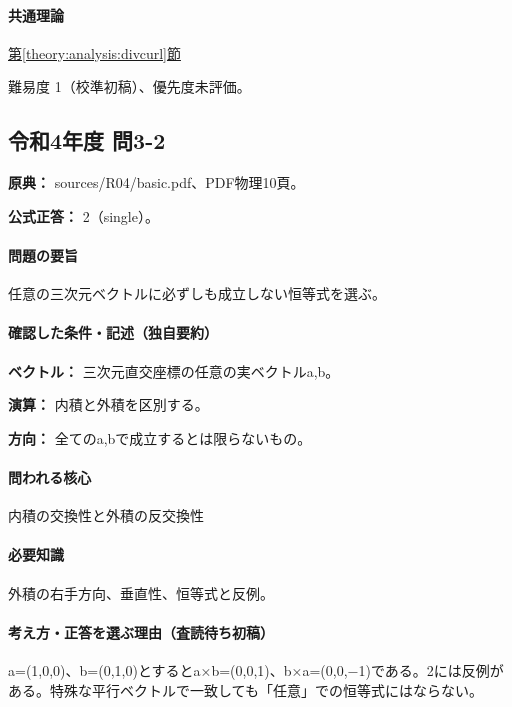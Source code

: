 \paragraph{共通理論} \hyperref[theory:analysis:divcurl]{第\ref*{theory:analysis:divcurl}節}

\par 難易度 1（校準初稿）、優先度未評価。

\subsection{令和4年度 問3-2}
\label{q:r04-reg-basic-3-2}

\noindent\textbf{原典：} sources/R04/basic.pdf、PDF物理10頁。

\textbf{公式正答：} 2（single）。

\paragraph{問題の要旨} 任意の三次元ベクトルに必ずしも成立しない恒等式を選ぶ。

\paragraph{確認した条件・記述（独自要約）}\mbox{}\par

\noindent\textbf{ベクトル：} 三次元直交座標の任意の実ベクトルa,b。\par

\noindent\textbf{演算：} 内積と外積を区別する。\par

\noindent\textbf{方向：} 全てのa,bで成立するとは限らないもの。\par

\paragraph{問われる核心} 内積の交換性と外積の反交換性

\paragraph{必要知識} 外積の右手方向、垂直性、恒等式と反例。

\paragraph{考え方・正答を選ぶ理由（査読待ち初稿）} a=\allowbreak{}(1,0,0)、b=\allowbreak{}(0,1,0)とするとa×b=\allowbreak{}(0,0,1)、b×a=\allowbreak{}(0,0,−1)である。2には反例がある。特殊な平行ベクトルで一致しても「任意」での恒等式にはならない。

